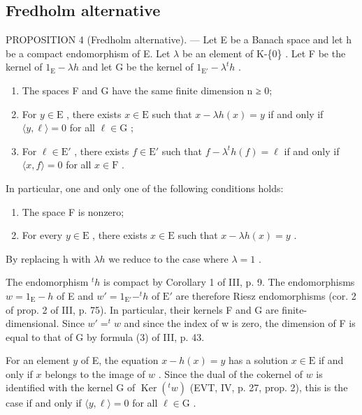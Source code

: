 \subsection{Fredholm alternative}

PROPOSITION 4 (Fredholm alternative). --- Let E be a Banach space and let h be a compact endomorphism of E. Let \(\lambda\) be an element of K-\{0\} . Let F be the kernel of \(1_{\mathrm{E}} - \lambda h\) and let G be the kernel of \(1_{\mathrm{E}'} - \lambda^{t}h\) .

\begin{enumerate}
\def\labelenumi{\alph{enumi})}
\item
  The spaces F and G have the same finite dimension n ≥ 0;
\item
  For \(y \in \mathrm{E}\) , there exists \(x \in \mathrm{E}\) such that \(x - \lambda h(x) = y\) if and only if \(\langle y, \ell \rangle = 0\) for all \(\ell \in \mathrm{G}\) ;
\item
  For \(\ell \in \mathrm{E}'\) , there exists \(f \in \mathrm{E}'\) such that \(f - \lambda^t h(f) = \ell\) if and only if \(\langle x, f \rangle = 0\) for all \(x \in \mathrm{F}\) .
\end{enumerate}

In particular, one and only one of the following conditions holds:

\begin{enumerate}
\def\labelenumi{(\roman{enumi})}
\item
  The space F is nonzero;
\item
  For every \(y \in \mathrm{E}\) , there exists \(x \in \mathrm{E}\) such that \(x - \lambda h(x) = y\) .
\end{enumerate}

By replacing h with \(\lambda h\) we reduce to the case where \(\lambda = 1\) .

The endomorphism \(^{t}h\) is compact by Corollary 1 of III, p. 9. The endomorphisms \(w = 1_{\mathrm{E}} - h\) of E and \(w' = 1_{\mathrm{E}'} - ^{t}h\) of \(\mathrm{E}'\) are therefore Riesz endomorphisms (cor. 2 of prop. 2 of III, p. 75). In particular, their kernels F and G are finite-dimensional. Since \(w' = ^{t}w\) and since the index of w is zero, the dimension of F is equal to that of G by formula (3) of III, p. 43.

For an element \(y\) of E, the equation \(x - h(x) = y\) has a solution \(x \in \mathrm{E}\) if and only if \(x\) belongs to the image of \(w\) . Since the dual of the cokernel of \(w\) is identified with the kernel G of \(\operatorname{Ker}(^t w)\) (EVT, IV, p. 27, prop. 2), this is the case if and only if \(\langle y, \ell \rangle = 0\) for all \(\ell \in \mathrm{G}\) .

